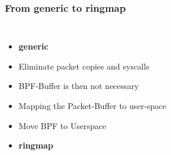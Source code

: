 \documentclass{beamer}
\begin{document}
\begin{frame}
\frametitle{From generic to ringmap}
\begin{columns}
\vspace{-1em}
\begin{itemize}
	\item<1->\textbf{generic}
	\item<2->Eliminate packet copies  and syscalls
	\item<3->BPF-Buffer is then not necessary
	\item<4->Mapping the Packet-Buffer to user-space
	\item<5->Move BPF to Userspace\newline
	\item<6->[$\Rightarrow$]\textbf{ringmap}
\end{itemize}
\vspace{-2em}

\end{columns}
\end{frame}
\end{document}
